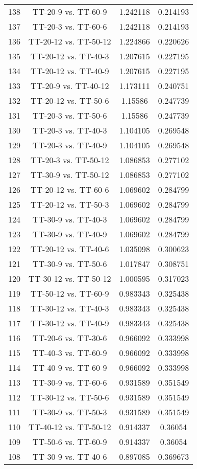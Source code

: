 \documentclass[a4paper,10pt]{article}
\begin{document}
\begin{landscape}
\begin{table}[!htp]
\begin{tabular}{cccc}
138&TT-20-9 vs. TT-60-9&1.242118&0.214193\\
137&TT-20-3 vs. TT-60-6&1.242118&0.214193\\
136&TT-20-12 vs. TT-50-12&1.224866&0.220626\\
135&TT-20-12 vs. TT-40-3&1.207615&0.227195\\
134&TT-20-12 vs. TT-40-9&1.207615&0.227195\\
133&TT-20-9 vs. TT-40-12&1.173111&0.240751\\
132&TT-20-12 vs. TT-50-6&1.15586&0.247739\\
131&TT-20-3 vs. TT-50-6&1.15586&0.247739\\
130&TT-20-3 vs. TT-40-3&1.104105&0.269548\\
129&TT-20-3 vs. TT-40-9&1.104105&0.269548\\
128&TT-20-3 vs. TT-50-12&1.086853&0.277102\\
127&TT-30-9 vs. TT-50-12&1.086853&0.277102\\
126&TT-20-12 vs. TT-60-6&1.069602&0.284799\\
125&TT-20-12 vs. TT-50-3&1.069602&0.284799\\
124&TT-30-9 vs. TT-40-3&1.069602&0.284799\\
123&TT-30-9 vs. TT-40-9&1.069602&0.284799\\
122&TT-20-12 vs. TT-40-6&1.035098&0.300623\\
121&TT-30-9 vs. TT-50-6&1.017847&0.308751\\
120&TT-30-12 vs. TT-50-12&1.000595&0.317023\\
119&TT-50-12 vs. TT-60-9&0.983343&0.325438\\
118&TT-30-12 vs. TT-40-3&0.983343&0.325438\\
117&TT-30-12 vs. TT-40-9&0.983343&0.325438\\
116&TT-20-6 vs. TT-30-6&0.966092&0.333998\\
115&TT-40-3 vs. TT-60-9&0.966092&0.333998\\
114&TT-40-9 vs. TT-60-9&0.966092&0.333998\\
113&TT-30-9 vs. TT-60-6&0.931589&0.351549\\
112&TT-30-12 vs. TT-50-6&0.931589&0.351549\\
111&TT-30-9 vs. TT-50-3&0.931589&0.351549\\
110&TT-40-12 vs. TT-50-12&0.914337&0.36054\\
109&TT-50-6 vs. TT-60-9&0.914337&0.36054\\
108&TT-30-9 vs. TT-40-6&0.897085&0.369673\\

\end{tabular}
\end{table}
\end{landscape}
\end{document}

